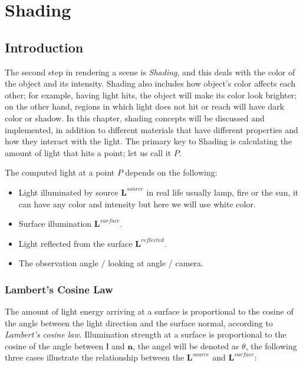 \documentclass{article}
\begin{document}
	
	\clearpage
	
	
	
	
	\section{Shading}
	\subsection{Introduction}
	
    The second step in rendering a scene is \textit{Shading}, and this deals with the color of the object and its intensity. Shading also includes how object's color affects each other; for example, having light hits, the object will make its color look brighter; on the other hand, regions in which light does not hit or reach will have dark color or shadow. In this chapter, shading concepts will be discussed and implemented, in addition to different materials that have different properties and how they interact with the light. The primary key to Shading is calculating the amount of light that hits a point; let us call it $ P $. 
	
	The computed light at a point $ P $ depends on the following: 
	
	\begin{itemize}
		\item Light illuminated by source  $\pmb{L}^{source}$  in real life usually lamp, fire or the sun, it can have any color and intensity but here we will use white color. 
		\item Surface illumination $\pmb{L}^{surface}$.
		\item Light reflected from the surface $\pmb{L}^{reflected}$.
		\item The observation angle / looking at angle / camera. 
	\end{itemize}
	
	
	
	
	\subsubsection{Lambert's Cosine Law}
	The amount of light energy arriving at a surface is proportional to the cosine of the angle between the light direction and the surface normal, according to \textit{Lambert's cosine law}. Illumination strength at a surface is proportional to the cosine of the angle between $\pmb{l}$ and $\pmb{n}$, the angel will be denoted as $\theta$, the following three cases illustrate the relationship between the  $\pmb{L}^{source}$ and  $\pmb{L}^{surface}$:
	
\end{document}
